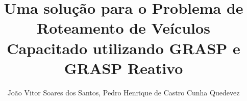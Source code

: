 \documentclass[12pt]{article}
\title{Uma solução para o Problema de Roteamento de Veículos Capacitado utilizando GRASP e GRASP Reativo}
\author{João Vitor Soares dos Santos\inst{1}, Pedro Henrique de Castro Cunha Quedevez\inst{1}}
\begin{document}
\maketitle










\renewcommand{\refname}{Referências}
\begingroup
\scriptsize

\normalsize
\endgroup
\end{document}
